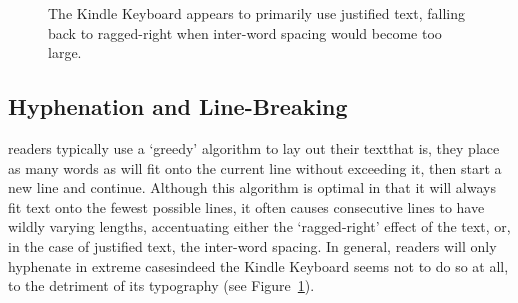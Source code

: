 \begin{figure}
    \centering
    \caption{The Kindle Keyboard appears to primarily use justified text, falling back to ragged-right when inter-word spacing would become too large.}
    \label{fig:crapkindle}
\end{figure}

\subsection{Hyphenation and Line-Breaking}
\Ebook{} readers typically use a `greedy' algorithm to lay out their text\ed that is, they place as many words as will fit onto the current line without exceeding it, then start a new line and continue. Although this algorithm is optimal in that it will always fit text onto the fewest possible lines, it often causes consecutive lines to have wildly varying lengths, accentuating either the `ragged-right' effect of the text, or, in the case of justified text, the inter-word spacing. In general, \ebook{} readers will only hyphenate in extreme cases\ed indeed the Kindle Keyboard seems not to do so at all, to the detriment of its typography (see Figure~\ref{fig:crapkindle}).

